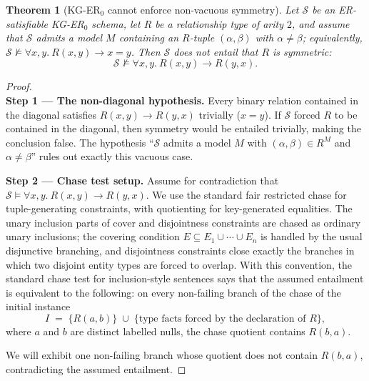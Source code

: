 \documentclass[10pt]{article}
\newtheorem*{theorem}{Theorem}
\begin{document}
\begin{theorem}[KG-ER$_0$ cannot enforce non-vacuous symmetry]
\label{thm:kger-no-symmetry}
Let \(\mathcal S\) be an ER-satisfiable KG-ER\(_0\) schema, let
\(R\) be a relationship type of arity \(2\), and assume that
\(\mathcal S\) admits a model \(M\) containing an \(R\)-tuple
\((\alpha,\beta)\) with \(\alpha\neq\beta\); equivalently,
\(\mathcal S\not\models\forall x,y.\ R(x,y)\to x=y\).
Then \(\mathcal S\) does not entail that \(R\) is symmetric:
\[
\mathcal S\not\models \forall x,y.\ R(x, y) \rightarrow R(y, x).
\]
\end{theorem}

\begin{proof}
\phantom{}\\
\smallskip\noindent\textbf{Step 1 --- The non-diagonal hypothesis.}
Every binary relation contained in the diagonal satisfies
\(R(x,y)\to R(y,x)\) trivially (\(x=y\)).  If \(\mathcal S\) forced
\(R\) to be contained in the diagonal, then symmetry would be entailed
trivially, making the conclusion false.  The hypothesis
``\(\mathcal S\) admits a model \(M\) with \((\alpha,\beta)\in R^M\)
and \(\alpha\neq\beta\)'' rules out exactly this vacuous case.

\smallskip\noindent\textbf{Step 2 --- Chase test setup.}
Assume for contradiction that
\(\mathcal S\models\forall x,y.\ R(x,y)\to R(y,x)\).  We use the
standard fair restricted chase for tuple-generating constraints,
with quotienting for key-generated equalities.  The unary inclusion
parts of cover and disjointness constraints are chased as ordinary
unary inclusions; the covering condition
\(E\subseteq E_1\cup\cdots\cup E_n\) is handled by the usual
disjunctive branching, and disjointness constraints close exactly the
branches in which two disjoint entity types are forced to overlap.
With this convention, the standard
chase test for inclusion-style sentences says that the assumed
entailment is equivalent to the following: on every non-failing
branch of the chase of the initial instance
\[
I \;=\; \{R(a,b)\}\;\cup\;\{\text{type facts forced by the declaration of } R\},
\]
where \(a\) and \(b\) are distinct labelled nulls, the chase
quotient contains \(R(b,a)\).

We will exhibit one non-failing branch whose quotient does not
contain \(R(b,a)\), contradicting the assumed entailment.


\end{proof}
\end{document}
